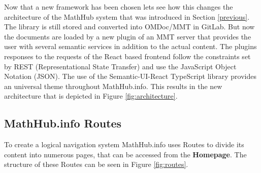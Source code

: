 \documentclass[11pt,a4paper]{article}
\begin{document}
Now that a new framework has been chosen lets see how this changes the architecture of the MathHub system that was introduced in Section \ref{previous}.
The library is still stored and converted into OMDoc/MMT in GitLab.
But now the documents are loaded by a new plugin of an MMT server that provides the user with several semantic services in addition to the actual content.
The plugins responses to the requests of the React based frontend follow the constraints set by REST (Representational State Transfer) and use the JavaScript Object Notation (JSON).
The use of the Semantic-UI-React TypeScript library provides an universal theme throughout MathHub.info.
This results in the new architecture that is depicted in Figure \ref{fig:architecture}.
\newpage
\subsection{MathHub.info Routes} \label{routes}
To create a logical navigation system MathHub.info uses Routes to divide its content into numerous pages, that can be accessed from the \textbf{Homepage}.
The structure of these Routes can be seen in Figure \ref{fig:routes}.
\end{document}
